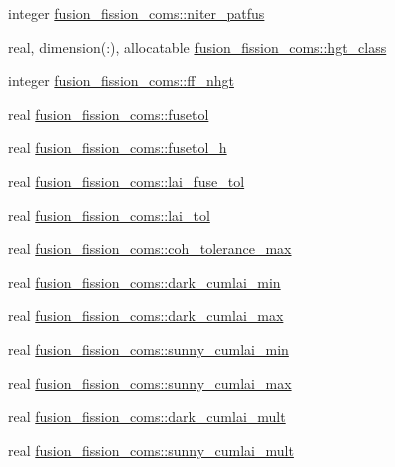 \begin{DoxyCompactItemize}
\item 
integer \hyperlink{namespacefusion__fission__coms_a08e50e0002f567a0ba2065dcec007a5d}{fusion\+\_\+fission\+\_\+coms\+::niter\+\_\+patfus}
\item 
real, dimension(\+:), allocatable \hyperlink{namespacefusion__fission__coms_ae764a0782d428f619f8699436f781b6a}{fusion\+\_\+fission\+\_\+coms\+::hgt\+\_\+class}
\item 
integer \hyperlink{namespacefusion__fission__coms_a70870869c112cab58081fe3db61c9dc7}{fusion\+\_\+fission\+\_\+coms\+::ff\+\_\+nhgt}
\item 
real \hyperlink{namespacefusion__fission__coms_ab21fc53bfafeb048e8f02a26cd204b02}{fusion\+\_\+fission\+\_\+coms\+::fusetol}
\item 
real \hyperlink{namespacefusion__fission__coms_a19463812b3be234c086b50080c6431cf}{fusion\+\_\+fission\+\_\+coms\+::fusetol\+\_\+h}
\item 
real \hyperlink{namespacefusion__fission__coms_ab1cef63eced987708359ace3d7c8405d}{fusion\+\_\+fission\+\_\+coms\+::lai\+\_\+fuse\+\_\+tol}
\item 
real \hyperlink{namespacefusion__fission__coms_ad01836d622d3d9ece106127c598eb0d5}{fusion\+\_\+fission\+\_\+coms\+::lai\+\_\+tol}
\item 
real \hyperlink{namespacefusion__fission__coms_a26b067f4070a314e0e5d2c52088aa6d9}{fusion\+\_\+fission\+\_\+coms\+::coh\+\_\+tolerance\+\_\+max}
\item 
real \hyperlink{namespacefusion__fission__coms_a8f814b477d6953f5b8f16e71d0014d64}{fusion\+\_\+fission\+\_\+coms\+::dark\+\_\+cumlai\+\_\+min}
\item 
real \hyperlink{namespacefusion__fission__coms_a750dd18910894531bd08cc5449849759}{fusion\+\_\+fission\+\_\+coms\+::dark\+\_\+cumlai\+\_\+max}
\item 
real \hyperlink{namespacefusion__fission__coms_af9d1927c4edb9281fb1ee94b3cf43820}{fusion\+\_\+fission\+\_\+coms\+::sunny\+\_\+cumlai\+\_\+min}
\item 
real \hyperlink{namespacefusion__fission__coms_a9eadfcde9b06a4ed1c36ffa027a98c80}{fusion\+\_\+fission\+\_\+coms\+::sunny\+\_\+cumlai\+\_\+max}
\item 
real \hyperlink{namespacefusion__fission__coms_a858c59d63500c90bf2d5aa0d9304597f}{fusion\+\_\+fission\+\_\+coms\+::dark\+\_\+cumlai\+\_\+mult}
\item 
real \hyperlink{namespacefusion__fission__coms_a75dd3af0dafb1c866f6b29f647227a79}{fusion\+\_\+fission\+\_\+coms\+::sunny\+\_\+cumlai\+\_\+mult}

\end{DoxyCompactItemize}
